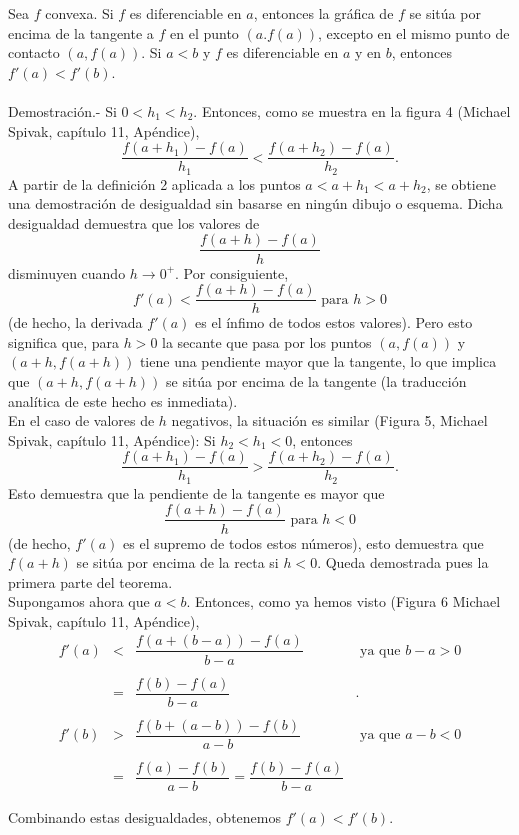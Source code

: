 \begin{teo}
    Sea $f$ convexa. Si $f$ es diferenciable en $a$, entonces la gráfica de $f$ se sitúa por encima de la tangente a $f$ en el punto $(a.f(a))$, excepto en el mismo punto de contacto $(a,f(a))$. Si $a<b$ y $f$ es diferenciable en $a$ y en $b$, entonces $f'(a)<f'(b)$.\\\\
	Demostración.-\; Si $0<h_1<h_2$. Entonces, como se muestra en la figura 4 (Michael Spivak, capítulo 11, Apéndice),
	$$\dfrac{f(a+h_1)-f(a)}{h_1}<\dfrac{f(a+h_2)-f(a)}{h_2}.$$
	A partir de la definición 2 aplicada a los puntos $a<a+h_1<a+h_2$, se obtiene una demostración de desigualdad sin basarse en ningún dibujo o esquema. Dicha desigualdad demuestra que los valores de 
	$$\dfrac{f(a+h)-f(a)}{h}$$
	disminuyen cuando $h\to 0^+$. Por consiguiente,
	$$f'(a)<\dfrac{f(a+h)-f(a)}{h}\mbox{ para }h>0$$
	(de hecho, la derivada $f'(a)$ es el ínfimo de todos estos valores). Pero esto significa que, para $h>0$ la secante que pasa por los puntos $(a,f(a))$ y $(a+h,f(a+h))$ tiene una pendiente mayor que la tangente, lo que implica que $(a+h,f(a+h))$ se sitúa por encima de la tangente (la traducción analítica de este hecho es inmediata).\\
	En el caso de valores de $h$ negativos, la situación es similar (Figura 5, Michael Spivak, capítulo 11, Apéndice): Si $h_2<h_1<0$, entonces
	$$\dfrac{f(a+h_1)-f(a)}{h_1}>\dfrac{f(a+h_2)-f(a)}{h_2}.$$
	Esto demuestra que la pendiente de la tangente es mayor que
	$$\dfrac{f(a+h)-f(a)}{h}\mbox{ para } h<0$$
	(de hecho, $f'(a)$ es el supremo de todos estos números), esto demuestra que $f(a+h)$ se sitúa por encima de la recta si $h<0$. Queda demostrada pues la primera parte del teorema.\\

	Supongamos ahora que $a<b$. Entonces, como ya hemos visto (Figura 6 Michael Spivak, capítulo 11, Apéndice),
	$$
	\begin{array}{rcll}
	    f'(a)&<&\dfrac{f(a+(b-a))-f(a)}{b-a}&\mbox{ ya que }b-a>0\\\\
		 &=&\dfrac{f(b)-f(a)}{b-a}&.\\\\
	    f'(b)&>&\dfrac{f(b+(a-b))-f(b)}{a-b}&\mbox{ ya que } a-b<0\\\\
		 &=&\dfrac{f(a)-f(b)}{a-b}=\dfrac{f(b)-f(a)}{b-a}&
	\end{array}
	$$

	Combinando estas desigualdades, obtenemos $f'(a)<f'(b).$
\end{teo}

